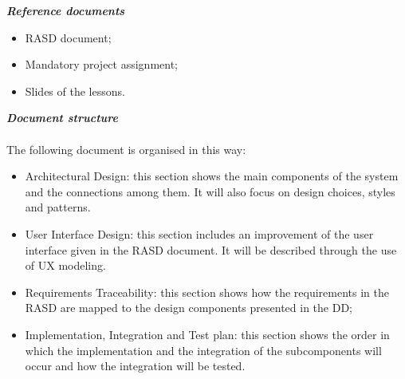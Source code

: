 \begin{legal}
\begin{itemize}
			\end{itemize}
		\item \textit{\textbf{Reference documents}}\\
			\begin{itemize}
				\item RASD document;
				\item Mandatory project assignment;
				\item Slides of the lessons.\\
			\end{itemize}
		\item \textit{\textbf{Document structure}}\\\\
		The following document is organised in this way:
		\begin{itemize}
				\item Architectural Design: this section shows the main components of the system and the connections among them. It will also focus on design choices, styles and patterns.
				\item User Interface Design: this section includes an improvement of the user interface given in the RASD document. It will be described through the use of UX modeling.
				\item Requirements Traceability: this section shows how the requirements in the RASD are mapped to the design components presented in the DD;
				\item Implementation, Integration and Test plan: this section shows the order in which the implementation and the integration of the subcomponents will occur and how the integration will be tested.\\\\
			\end{itemize}
  	\end{legal}

